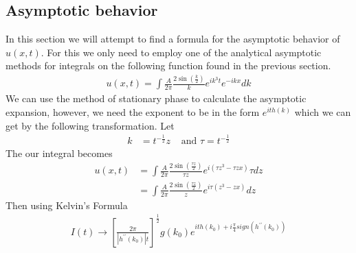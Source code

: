 \documentclass{article}
\begin{document}
\subsection{Asymptotic behavior}
In this section we will attempt to find a formula for the asymptotic behavior of $u(x,t)$. For this we only need to employ one of the analytical asymptotic methods for integrals on the following function found in the previous section. 
\begin{align*}
u(x,t) =  \int \frac{A}{2\pi}\frac{2\sin(\frac{k}{2})}{k} e^{ik^3t}e^{-ikx}dk
\end{align*}
We can use the method of stationary phase to calculate the asymptotic expansion, however, we need the exponent to be in the form $e^{ith(k)}$ which we can get by the following transformation. Let
\begin{align*}
k &= t^{-\frac{1}{2}}z &\text{ and } \tau=t^{-\frac{1}{2}}
\end{align*}
The our integral becomes 
\begin{align*}
u(x,t) &= \int \frac{A}{2\pi} \frac{2\sin(\frac{\tau z}{2})}{\tau z} e^{i(\tau z^3 - \tau z x)} \tau dz \\
&= \int \frac{A}{2\pi} \frac{2\sin(\frac{\tau z}{2})}{ z} e^{i\tau(z^3 - z x)} dz
\end{align*}
Then using Kelvin's Formula 
\begin{align*}
I(t) \rightarrow \left[\frac{2\pi}{|h^{\prime\prime}(k_0)|t}\right]^{\frac{1}{2}} g(k_0)e^{ith(k_0) + i \frac{\pi}{4}sign(h^{\prime\prime}(k_0))}
\end{align*}
\end{document}
